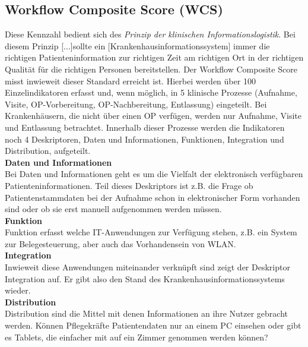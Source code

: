 \subsection{Workflow Composite Score (WCS)}
	Diese Kennzahl bedient sich des \textit{Prinzip der klinischen Informationslogistik}. Bei diesem Prinzip \glqq{}[...]sollte ein [Krankenhausinformationssystem] immer die richtigen Patienteninformation zur richtigen Zeit am richtigen Ort in der richtigen Qualität für die richtigen Personen bereitstellen.\grqq\parencite[36]{huebner2019} Der Workflow Composite Score misst inwieweit dieser Standard erreicht ist. Hierbei werden über 100 Einzelindikatoren erfasst und, wenn möglich, in 5 klinische Prozesse (Aufnahme, Visite, OP-Vorbereitung, OP-Nachbereitung, Entlassung) eingeteilt. Bei Krankenhäusern, die nicht über einen OP verfügen, werden nur Aufnahme, Visite und Entlassung betrachtet. Innerhalb dieser Prozesse werden die Indikatoren noch 4 Deskriptoren, Daten und Informationen, Funktionen, Integration und Distribution, aufgeteilt. \parencite{huebner2019}
	\vspace{\parheadvspace}\\
	\textbf{Daten und Informationen}\\
	Bei Daten und Informationen geht es um die Vielfalt der elektronisch verfügbaren Patienteninformationen. Teil dieses Deskriptors ist z.B. die Frage ob Patientenstammdaten bei der Aufnahme schon in elektronischer Form vorhanden sind oder ob sie erst manuell aufgenommen werden müssen. 
	\vspace{\parheadvspace}\\
	\textbf{Funktion}\\
	Funktion erfasst welche IT-Anwendungen zur Verfügung stehen, z.B. ein System zur Belegesteuerung, aber auch das Vorhandensein von WLAN.
	\vspace{\parheadvspace}\\
	\textbf{Integration}\\
	Inwieweit diese Anwendungen miteinander verknüpft sind zeigt der Deskriptor Integration auf. Er gibt also den Stand des Krankenhausinformationssystems wieder.
	\vspace{\parheadvspace}\\
	\textbf{Distribution}\\
	Distribution sind die Mittel mit denen Informationen an ihre Nutzer gebracht werden. Können Pflegekräfte Patientendaten nur an einem PC einsehen oder gibt es Tablets, die einfacher mit auf ein Zimmer genommen werden können?

